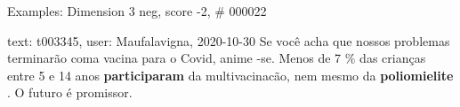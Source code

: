 \begin{frame}{Examples: Dimension 3 neg, score -2, \# 000022}
\footnotesize
\begin{alertblock}{text: t003345, user: Maufalavigna, 2020-10-30}
Se você acha que nossos problemas terminarão coma vacina para o Covid, anime 
-se. Menos de 7 \% das crianças entre 5 e 14 anos \textbf{participaram} da 
multivacinacão, nem mesmo da \textbf{poliomielite} . O futuro é promissor. 
\end{alertblock}
\end{frame}
